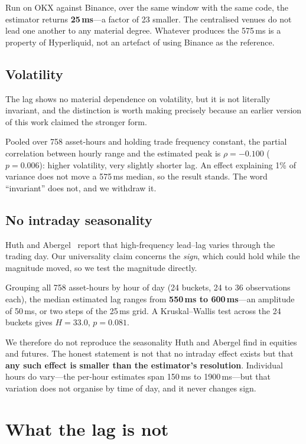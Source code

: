 \documentclass[11pt,a4paper]{article}
\begin{document}
Run on OKX against Binance, over the same window with the same code, the estimator returns
\textbf{25\,ms}---a factor of 23 smaller. The centralised venues do not lead one another to any
material degree. Whatever produces the 575\,ms is a property of Hyperliquid, not an artefact of
using Binance as the reference.

\subsection{Volatility}

The lag shows no material dependence on volatility, but it is not literally invariant, and the
distinction is worth making precisely because an earlier version of this work claimed the
stronger form.

Pooled over 758 asset-hours and holding trade frequency constant, the partial correlation between
hourly range and the estimated peak is $\rho = -0.100$ ($p = 0.006$): higher volatility, very
slightly shorter lag. An effect explaining 1\% of variance does not move a 575\,ms median, so the
result stands. The word ``invariant'' does not, and we withdraw it.

\subsection{No intraday seasonality}
\label{sec:seasonality}

Huth and Abergel~\cite{huth2014} report that high-frequency lead--lag varies through the trading
day. Our universality claim concerns the \emph{sign}, which could hold while the magnitude moved,
so we test the magnitude directly.

Grouping all 758 asset-hours by hour of day (24 buckets, 24 to 36 observations each), the median
estimated lag ranges from \textbf{550\,ms to 600\,ms}---an amplitude of 50\,ms, or two steps of
the 25\,ms grid. A Kruskal--Wallis test across the 24 buckets gives $H = 33.0$, $p = 0.081$.

We therefore do not reproduce the seasonality Huth and Abergel find in equities and futures. The
honest statement is not that no intraday effect exists but that \textbf{any such effect is smaller
than the estimator's resolution}. Individual hours do vary---the per-hour estimates span 150\,ms
to 1900\,ms---but that variation does not organise by time of day, and it never changes sign.

\section{What the lag is not}
\label{sec:notwhat}
\end{document}
